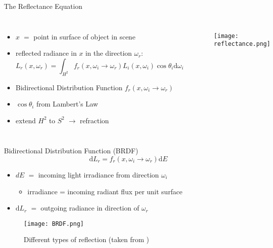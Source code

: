 \begin{frame}{The Reflectance Equation}
\begin{columns}
\begin{itemize}
    \item $x$ $=$ point in surface of object in scene
    \item reflected radiance in $x$ in the direction $\omega_r$: 
    \begin{equation} 
L_r(x, \omega_r) = \int_{H^2} f_r(x, \omega_i \rightarrow \omega_r) L_i(x, \omega_i) \cos \theta_i \mathrm{d}\omega_i
\end{equation}
    \item Bidirectional Distribution Function $f_r(x, \omega_i \rightarrow \omega_r) $
    \item $\cos \theta_i$ from Lambert's Law
    \item extend $H^2$ to $S^2$ $\rightarrow$ refraction
\end{itemize}
\begin{figure}
\texttt{[image: reflectance.png]}
\end{figure}
\end{columns}
\end{frame}

\begin{frame}{Bidirectional Distribution Function (BRDF)}
\begin{equation}
\mathrm{d}L_r = f_r(x, \omega_i \rightarrow \omega_r) \mathrm{d}E
\end{equation}
\begin{itemize}
    \item  $dE$ $=$ incoming light irradiance from direction $\omega_i$ 
    \begin{itemize}
        \item irradiance = incoming radiant flux per unit surface
    \end{itemize}
    \item $\mathrm{d}L_r$ $=$ outgoing radiance in direction of $\omega_r$
\end{itemize}
\begin{center}
\begin{figure}
\texttt{[image: BRDF.png]}
\caption{Different types of reflection (taken from \cite{Bungartz.2014})}
\end{figure}
\end{center}
\end{frame}

